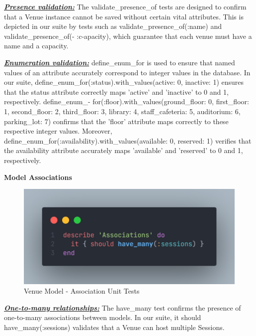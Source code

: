 \begin{justify}
\vspace{0.25cm}
\noindent\textbf{\textit{\underline{Presence validation:}}} The validate\_presence\_of tests are designed to confirm that a Venue instance cannot be saved without certain vital attributes. This is depicted in our suite by tests such as validate\_presence\_of(:name) and validate\_presence\_of(- :c-apacity), which guarantee that each venue must have a name and a capacity.

\vspace{0.25cm}
\noindent\textbf{\textit{\underline{Enumeration validation:}}} define\_enum\_for is used to ensure that named values of an attribute accurately correspond to integer values in the database. In our suite, define\_enum\_for(:status).with\_values(active: 0, inactive: 1) ensures that the status attribute correctly maps 'active' and 'inactive' to 0 and 1, respectively. define\_enum\_- for(:floor).with\_values(ground\_floor: 0, first\_floor: 1, second\_floor: 2, third\_floor: 3, library: 4, staff\_cafeteria: 5, auditorium: 6, parking\_lot: 7) confirms that the 'floor' attribute maps correctly to these respective integer values. Moreover, define\_enum\_for(:availability).with\_values(available: 0, reserved: 1) verifies that the availability attribute accurately maps 'available' and 'reserved' to 0 and 1, respectively.

\vspace{0.25cm}
\newendline
\textbf{Model Associations}

    \begin{figure}[H]
        \centerline{\includegraphics[width=140mm,scale=1]{figures/implementation_and_testing/testing/AUT/venue/associations.png}}
        \caption{Venue Model - Association Unit Tests}
        \label{Venue Model - Association Unit Tests}
    \end{figure}

\vspace{0.25cm}
\noindent\textbf{\textit{\underline{One-to-many relationships:}}} The have\_many test confirms the presence of one-to-many associations between models. In our suite, it { should have\_many(:sessions) } validates that a Venue can host multiple Sessions.



\end{justify}
